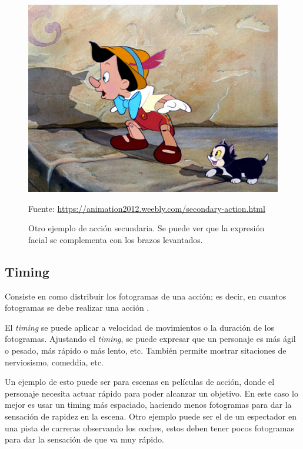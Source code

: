 \documentclass{article}
\begin{document}
\begin{figure}[H]
    \centering
    \includegraphics[width=\textwidth]{imagenes/sec-ac.jpg}
    \caption{Otro ejemplo de acción secundaria. Se puede ver que la expresión facial se complementa con los brazos levantados.}
    \vspace{10pt}
    \footnotesize{Fuente: \url{https://animation2012.weebly.com/secondary-action.html}}
\end{figure}
\subsection{Timing}

Consiste en como distribuir los fotogramas de una acción; es decir, en cuantos fotogramas se debe realizar una acción \cite{idearocket}.

\bigskip

El \textit{timing} se puede aplicar a velocidad de movimientos o la duración de los fotogramas. Ajustando el \textit{timing}, se puede expresar que un personaje es más ágil o pesado, más rápido o más lento, etc. También permite mostrar sitaciones de nerviosismo, comeddia, etc.

\bigskip

Un ejemplo de esto puede ser para escenas en películas de acción, donde el personaje necesita actuar rápido para poder alcanzar un objetivo. En este caso lo mejor es usar un timing más espaciado, haciendo menos fotogramas para dar la sensación de rapidez en la escena. 
Otro ejemplo puede ser el de un espectador en una pista de carreras observando los coches, estos deben tener pocos fotogramas para dar la sensación de que va muy rápido.
\end{document}
